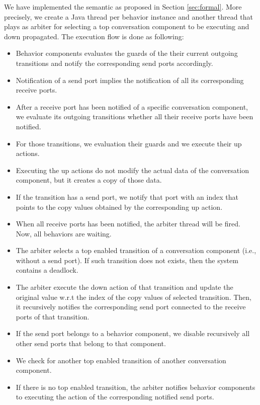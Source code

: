 We have implemented the semantic as proposed in Section \ref{sec:formal}. More precisely, we create a Java thread per behavior instance and another thread that plays as arbiter for selecting a top conversation component to be executing and down propagated. The execution flow is done as following: 
\begin{itemize}
\item Behavior components evaluates the guards of the their current outgoing transitions and notify the corresponding send ports accordingly.  
\item Notification of a send port implies the notification of all its corresponding receive ports. 
\item After a receive port has been notified of a specific conversation component, we evaluate its outgoing transitions whether all their receive ports have been notified. 
\item For those transitions, we evaluation their guards and we execute their up actions. 
\item Executing the up actions do not modify the actual data of the conversation component, but it creates a copy of those data. 
\item If the transition has a send port, we notify that port with an index that points to the copy values obtained by the corresponding up action. 
\item When all receive ports has been notified, the arbiter thread will be fired. Now, all behaviors are waiting. 
\item The arbiter selects a top enabled transition of a conversation component (i.e., without a send port). If such transition does not exists, then the system contains a deadlock. 
\item The arbiter execute the down action of that transition and update the original value w.r.t the index of the copy values of selected transition. Then, it recursively notifies the corresponding send port connected to the receive ports of that transition.  
\item If the send port belongs to a behavior component, we disable recursively all other send ports that belong to that component. 
\item We check for another top enabled transition of another conversation component. 
\item If there is no top enabled transition, the arbiter notifies behavior components to executing the action of the corresponding notified send ports. 
\end{itemize}

